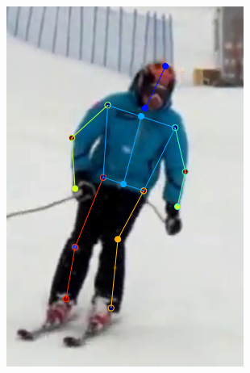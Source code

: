 \begin{figure}[t!]
\begin{subfigure}[b]{0.115\textwidth}
            \includegraphics[width=\textwidth]{resources/MotivativeAnnotation/MPII/bad_anno-3}
    \end{subfigure}
    \hfill
    \begin{subfigure}[b]{0.115\textwidth}

\end{subfigure}
\end{figure}
